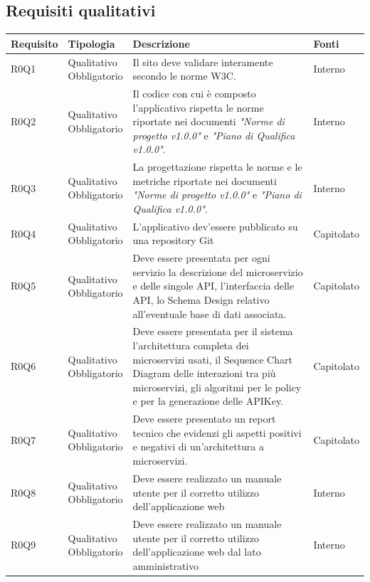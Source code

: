 \documentclass[12pt,a4paper,titlepage]{article}
\newcommand{\minitab}[2][1]{\begin{tabular}#1 #2\end{tabular}}
\begin{document}
	\subsection{Requisiti qualitativi}
	{\renewcommand\arraystretch{1.2}  %
		\small
		\begin{longtable}{|m{5em}|m{6em}|m{28em}|m{5em}|}
			\hline
			\textbf{Requisito} & \textbf{Tipologia}  & \textbf{Descrizione} & \textbf{Fonti} \\
			\hline
			R0Q1 & \minitab[c]{Qualitativo\\Obbligatorio} & Il sito deve validare interamente secondo le norme W3C. & Interno\\
			\hline
			R0Q2 & \minitab[c]{Qualitativo\\Obbligatorio} & Il codice con cui è composto l'applicativo rispetta le norme riportate nei documenti \textit{"Norme di progetto v1.0.0"} e \textit{"Piano di Qualifica v1.0.0"}. & Interno\\
			\hline
			R0Q3 & \minitab[c]{Qualitativo\\Obbligatorio} & La progettazione rispetta le norme e le metriche riportate nei documenti \textit{"Norme di progetto v1.0.0"} e \textit{"Piano di Qualifica v1.0.0"}. & Interno\\
			\hline
			R0Q4 & \minitab[c]{Qualitativo\\Obbligatorio} & L'applicativo dev'essere pubblicato su una repository Git & Capitolato\\
			\hline
			R0Q5 & \minitab[c]{Qualitativo\\Obbligatorio} & Deve essere presentata per ogni servizio la descrizione del microservizio e delle singole API, l'interfaccia delle API, lo Schema Design relativo all'eventuale base di dati associata. & Capitolato\\
			\hline
			R0Q6 & \minitab[c]{Qualitativo\\Obbligatorio} & Deve essere presentata per il sistema l'architettura completa dei microservizi usati, il Sequence Chart Diagram delle interazioni tra più microservizi, gli algoritmi per le policy e per la generazione delle APIKey. & Capitolato\\
			\hline
			R0Q7 & \minitab[c]{Qualitativo\\Obbligatorio} & Deve essere presentato un report tecnico che evidenzi gli aspetti positivi e negativi di un'architettura a microservizi. & Capitolato\\
			\hline
			R0Q8 & \minitab[c]{Qualitativo\\Obbligatorio} & Deve essere realizzato un manuale utente per il corretto utilizzo dell'applicazione web & Interno\\
			\hline
			R0Q9 & \minitab[c]{Qualitativo\\Obbligatorio} & Deve essere realizzato un manuale utente per il corretto utilizzo dell'applicazione web dal lato amministrativo & Interno\\
			\hline
		\end{longtable}
	}
	\newpage
\end{document}
